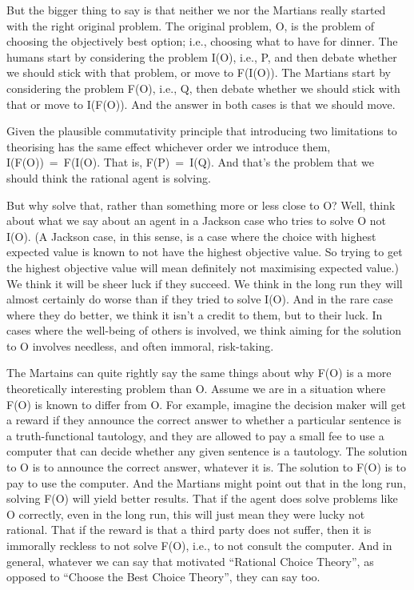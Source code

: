 \documentclass[
  11pt,
]{book}
\begin{document}
But the bigger thing to say is that neither we nor the Martians really started with the right original problem. The original problem, O, is the problem of choosing the objectively best option; i.e., choosing what to have for dinner. The humans start by considering the problem I(O), i.e., P, and then debate whether we should stick with that problem, or move to F(I(O)). The Martians start by considering the problem F(O), i.e., Q, then debate whether we should stick with that or move to I(F(O)). And the answer in both cases is that we should move.

Given the plausible commutativity principle that introducing two limitations to theorising has the same effect whichever order we introduce them, I(F(O))~=~F(I(O). That is, F(P)~=~I(Q). And that's the problem that we should think the rational agent is solving.

But why solve that, rather than something more or less close to O? Well, think about what we say about an agent in a Jackson case who tries to solve O not I(O). (A Jackson case, in this sense, is a case where the choice with highest expected value is known to not have the highest objective value. So trying to get the highest objective value will mean definitely not maximising expected value.) We think it will be sheer luck if they succeed. We think in the long run they will almost certainly do worse than if they tried to solve I(O). And in the rare case where they do better, we think it isn't a credit to them, but to their luck. In cases where the well-being of others is involved, we think aiming for the solution to O involves needless, and often immoral, risk-taking.

The Martains can quite rightly say the same things about why F(O) is a more theoretically interesting problem than O. Assume we are in a situation where F(O) is known to differ from O. For example, imagine the decision maker will get a reward if they announce the correct answer to whether a particular sentence is a truth-functional tautology, and they are allowed to pay a small fee to use a computer that can decide whether any given sentence is a tautology. The solution to O is to announce the correct answer, whatever it is. The solution to F(O) is to pay to use the computer. And the Martians might point out that in the long run, solving F(O) will yield better results. That if the agent does solve problems like O correctly, even in the long run, this will just mean they were lucky not rational. That if the reward is that a third party does not suffer, then it is immorally reckless to not solve F(O), i.e., to not consult the computer. And in general, whatever we can say that motivated ``Rational Choice Theory'', as opposed to ``Choose the Best Choice Theory'', they can say too.
\end{document}
